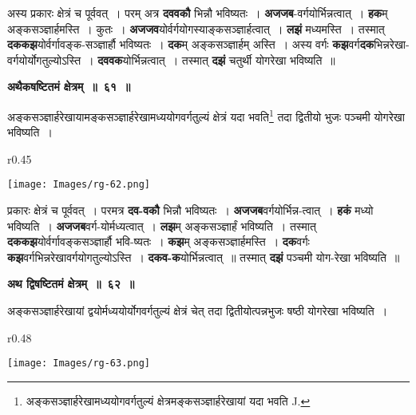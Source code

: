 \documentclass[11pt, openany]{book}
\begin{document}
अस्य प्रकारः क्षेत्रं च पूर्ववत्~। परम् अत्र \textbf{दववकौ} भिन्नौ भविष्यतः~। \textbf{अजजब}-वर्गयोर्भिन्नत्वात्~। \textbf{हक}म् अङ्कसञ्ज्ञार्हमस्ति~। कुतः~। \textbf{अजजव}योर्वर्गयोगस्याङ्कसञ्ज्ञार्हत्वात्~। \textbf{लझं} मध्यमस्ति~। तस्मात् \textbf{दककझ}योर्वर्गावङ्क-सञ्ज्ञार्हौ भविष्यतः~। \textbf{दक}म् अङ्कसञ्ज्ञार्हम् अस्ति~। अस्य वर्गः \textbf{कझ}वर्ग\textbf{दक}भिन्नरेखा-वर्गयोर्योगतुल्योऽस्ति~। \textbf{दववक}योर्भिन्नत्वात्~। तस्मात् \textbf{दझं} चतुर्थी योगरेखा भविष्यति~॥ 
\vspace{2mm}

\begin{center}
\textbf{\large अथैकषष्टितमं क्षेत्रम्~॥~६१~॥ }
\end{center}

{\ab अङ्कसञ्ज्ञार्हरेखायामङ्कसञ्ज्ञार्हरेखामध्ययोगवर्गतुल्यं क्षेत्रं यदा भवति\renewcommand{\thefootnote}{१}\footnote{अङ्कसञ्ज्ञार्हरेखामध्ययोगवर्गतुल्यं क्षेत्रमङ्कसञ्ज्ञार्हरेखायां यदा भवति {\en J.}} तदा द्वितीयो भुजः पञ्चमी योगरेखा भविष्यति~। }\\

\begin{wrapfigure}{r}{0.45\textwidth}
\vspace{-8mm}
\begin{flushright}
\texttt{[image: Images/rg-62.png]}
\end{flushright}
\vspace{-8mm}
\end{wrapfigure}

 प्रकारः क्षेत्रं च पूर्ववत्~। परमत्र \textbf{दव-वकौ} भिन्नौ भविष्यतः~। \textbf{अजजब}वर्गयोर्भिन्न-त्वात्~। \textbf{हकं} मध्यो भविष्यति~। \textbf{अजजब}वर्ग-योर्मध्यत्वात्~। \textbf{लझ}म् अङ्कसञ्ज्ञार्हं भविष्यति~। तस्मात् \textbf{दककझ}योर्वर्गावङ्कसञ्ज्ञार्हौ भवि-ष्यतः~। \textbf{कझ}म् अङ्कसञ्ज्ञार्हमस्ति~। \textbf{दक}वर्गः \textbf{कझ}वर्गभिन्नरेखावर्गयोगतुल्योऽस्ति~। \textbf{दकव-क}योर्भिन्नत्वात्~॥ तस्मात् \textbf{दझं} पञ्चमी योग-रेखा भविष्यति~॥ 
\vspace{2mm}

\begin{center}
\textbf{\large अथ द्विषष्टितमं क्षेत्रम्~॥~६२~॥ }
\end{center}

{\ab अङ्कसञ्ज्ञार्हरेखायां द्वयोर्मध्ययोर्योगवर्गतुल्यं क्षेत्रं चेत् तदा द्वितीयोत्पन्नभुजः षष्ठी योगरेखा भविष्यति~। }

\newpage

\begin{wrapfigure}{r}{0.48\textwidth}
\vspace{-5mm}
\begin{flushright}
\texttt{[image: Images/rg-63.png]}
\end{flushright}
\vspace{-8mm}
\end{wrapfigure}
\end{document}
